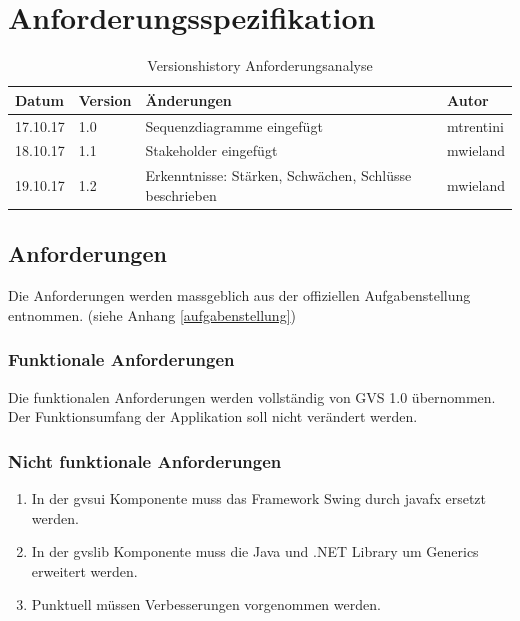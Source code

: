 \documentclass[11pt,a4paper,english,oneside]{book}
\numberwithin{equation}{chapter}
\begin{document}
	\chapter{Anforderungsspezifikation}
	
	
	\begin{table}[h!]
		\centering
		\begin{tabularx}{\linewidth}{l l X l}
			\toprule 
			Datum & Version & Änderungen & Autor \\
			\midrule
			17.10.17 & 1.0 & Sequenzdiagramme eingefügt & mtrentini \\
			18.10.17 & 1.1 & Stakeholder eingefügt & mwieland \\
			19.10.17 & 1.2 & Erkenntnisse: Stärken, Schwächen, Schlüsse beschrieben & mwieland \\
			\bottomrule 
		\end{tabularx} 
		\caption{Versionshistory Anforderungsanalyse} 
	\end{table}
	
	\section{Anforderungen} \label{sec:functionalreq}
	Die Anforderungen werden massgeblich aus der offiziellen Aufgabenstellung entnommen. (siehe Anhang \ref{aufgabenstellung})
	
	\subsection{Funktionale Anforderungen}
	Die funktionalen Anforderungen werden vollständig von GVS 1.0 \cite{gvs1} übernommen. Der Funktionsumfang der Applikation soll nicht verändert werden.
	
	\subsection{Nicht funktionale Anforderungen}
	
	\begin{enumerate}
		\item In der \gls{gvsui} Komponente muss das Framework Swing durch \gls{javafx} ersetzt werden.
		\item In der \gls{gvslib} Komponente muss die Java und .NET Library um Generics erweitert werden. 
		\item Punktuell müssen Verbesserungen vorgenommen werden.
	\end{enumerate}
\end{document}

